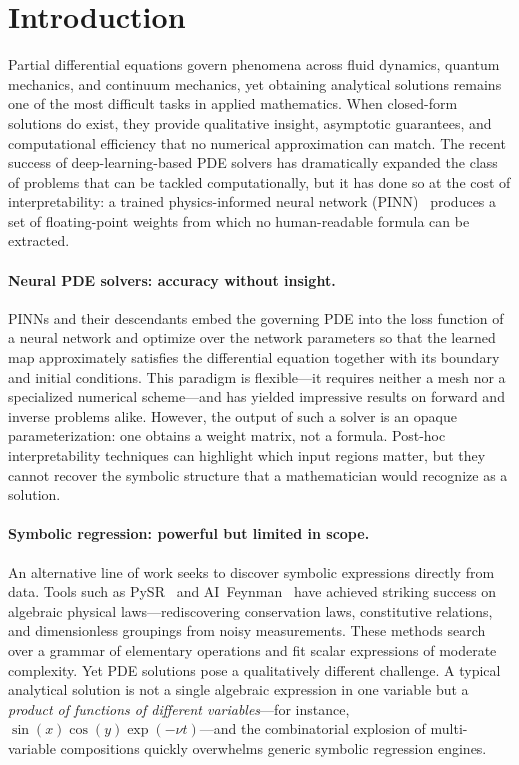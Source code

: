 \section{Introduction}
\label{sec:introduction}

Partial differential equations govern phenomena across fluid dynamics, quantum
mechanics, and continuum mechanics, yet obtaining analytical solutions remains
one of the most difficult tasks in applied mathematics.  When closed-form
solutions do exist, they provide qualitative insight, asymptotic guarantees,
and computational efficiency that no numerical approximation can match.
The recent success of deep-learning-based PDE solvers has dramatically
expanded the class of problems that can be tackled computationally, but it has
done so at the cost of interpretability: a trained physics-informed neural
network (PINN)~\cite{raissi2019} produces a set of floating-point weights from
which no human-readable formula can be extracted.

\paragraph{Neural PDE solvers: accuracy without insight.}
PINNs and their descendants embed the governing PDE into the loss function of a
neural network and optimize over the network parameters so that the learned
map approximately satisfies the differential equation together with its
boundary and initial conditions.  This paradigm is flexible---it requires
neither a mesh nor a specialized numerical scheme---and has yielded
impressive results on forward and inverse problems alike.  However, the output
of such a solver is an opaque parameterization: one obtains a weight matrix,
not a formula.  Post-hoc interpretability techniques can highlight which input
regions matter, but they cannot recover the symbolic structure that a
mathematician would recognize as a solution.

\paragraph{Symbolic regression: powerful but limited in scope.}
An alternative line of work seeks to discover symbolic expressions directly from
data.  Tools such as PySR~\cite{cranmer2023} and AI~Feynman~\cite{udrescu2020}
have achieved striking success on algebraic physical laws---rediscovering
conservation laws, constitutive relations, and dimensionless
groupings from noisy measurements.  These methods search over a grammar of
elementary operations and fit scalar expressions of moderate complexity.
Yet PDE solutions pose a qualitatively different challenge.  A typical
analytical solution is not a single algebraic expression in one variable but a
\emph{product of functions of different variables}---for instance,
$\sin(x)\cos(y)\exp(-\nu t)$---and the combinatorial explosion of
multi-variable compositions quickly overwhelms generic symbolic regression
engines.

